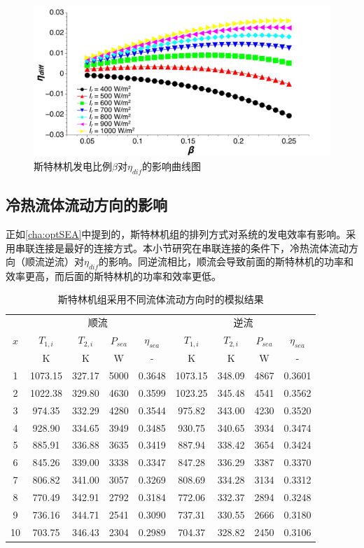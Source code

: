 \begin{figure}[ht]
\centering
	\includegraphics[width = 0.9\columnwidth, angle = 0]{fig/beta-eta_diff}
	\caption{斯特林机发电比例$\beta$对$\eta_{dif}$的影响曲线图}
	\label{fig:beta-eta_diff}
\end{figure}

\subsection{冷热流体流动方向的影响}

正如\autoref{cha:optSEA}中提到的，斯特林机组的排列方式对系统的发电效率有影响。采用串联连接是最好的连接方式。本小节研究在串联连接的条件下，冷热流体流动方向（顺流逆流）对$\eta_{dif}$的影响。同逆流相比，顺流会导致前面的斯特林机的功率和效率更高，而后面的斯特林机的功率和效率更低。

\begin{table}[htbp]
\setlength{\abovecaptionskip}{0pt}
	\caption{斯特林机组采用不同流体流动方向时的模拟结果}
	\centering
	\begin{tabular}{ccccccccc}
		\toprule
		\multirow{3}{*}{$x$}	&	\multicolumn{4}{c}{顺流}	&\multicolumn{4}{c}{逆流}\tabularnewline
		\cline{2-5}	\cline{6-9}
		&$T_{1,i}$&$T_{2,i}$&$P_{sea}$&$\eta_{sea}$&$T_{1,i}$&$T_{2,i}$&$P_{sea}$&$\eta_{sea}$\tabularnewline
		&K&K&W&-&K&K&W&-\tabularnewline
		\midrule
		1	&	1073.15	&	327.17	&	5000	&	0.3648	&	1073.15	&	348.09	&	4867	&	0.3601\\
		2	&	1022.38	&	329.80	&	4630	&	0.3599	&	1023.25	&	345.48	&	4541	&	0.3562\\
		3	&	974.35	&	332.29	&	4280	&	0.3544	&	975.82	&	343.00	&	4230	&	0.3520\\
		4	&	928.90	&	334.65	&	3949	&	0.3485	&	930.75	&	340.65	&	3934	&	0.3474\\
		5	&	885.91	&	336.88	&	3635	&	0.3419	&	887.94	&	338.42	&	3654	&	0.3424\\
		6	&	845.26	&	339.00	&	3338	&	0.3347	&	847.28	&	336.29	&	3387	&	0.3370\\
		7	&	806.82	&	341.00	&	3057	&	0.3269	&	808.69	&	334.28	&	3134	&	0.3312\\
		8	&	770.49	&	342.91	&	2792	&	0.3184	&	772.06	&	332.37	&	2894	&	0.3248\\
		9	&	736.16	&	344.71	&	2541	&	0.3090	&	737.31	&	330.55	&	2666	&	0.3180\\
		10	&	703.75	&	346.43	&	2304	&	0.2989	&	704.37	&	328.82	&	2450	&	0.3106\\
		\bottomrule
	\end{tabular}
	\label{tab:SEAresults}
\end{table}


